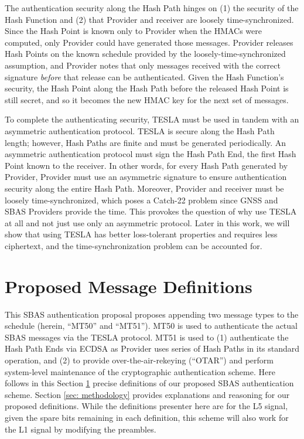 \documentclass[letterpaper,times]{IONconf/IONconf}
\begin{document}
The authentication security along the Hash Path hinges on (1) the security of the Hash Function and (2) that Provider and receiver are loosely time-synchronized.
Since the Hash Point is known only to Provider when the HMACs were computed, only Provider could have generated those messages.
Provider releases Hash Points on the known schedule provided by the loosely-time-synchronized assumption, and Provider notes that only messages received with the correct signature {\em before} that release can be authenticated.
Given the Hash Function's security, the Hash Point along the Hash Path before the released Hash Point is still secret, and so it becomes the new HMAC key for the next set of messages.

To complete the authenticating security, TESLA must be used in tandem with an asymmetric authentication protocol.
TESLA is secure along the Hash Path length; however, Hash Paths are finite and must be generated periodically.
An asymmetric authentication protocol must sign the Hash Path End, the first Hash Point known to the receiver.
In other words, for every Hash Path generated by Provider, Provider must use an asymmetric signature to ensure authentication security along the entire Hash Path.
Moreover, Provider and receiver must be loosely time-synchronized, which poses a Catch-22 problem since GNSS and SBAS Providers provide the time.
This provokes the question of why use TESLA at all and not just use only an asymmetric protocol.
Later in this work, we will show that using TESLA has better loss-tolerant properties and requires less ciphertext, and the time-synchronization problem can be accounted for.

\section{Proposed Message Definitions} \label{sec: definitions}

This SBAS authentication proposal proposes appending two message types to the schedule (herein, ``MT50'' and ``MT51'').
MT50 is used to authenticate the actual SBAS messages via the TESLA protocol.
MT51 is used to (1) authenticate the Hash Path Ends via ECDSA as Provider uses series of Hash Paths in its standard operation, and (2) to provide over-the-air-rekeying (``OTAR'') and perform system-level maintenance of the cryptographic authentication scheme.
Here follows in this Section \ref{sec: definitions} precise definitions of our proposed SBAS authentication scheme.
Section \ref{sec: methodology} provides explanations and reasoning for our proposed definitions.
While the definitions presenter here are for the L5 signal, given the spare bits remaining in each definition, this scheme will also work for the L1 signal by modifying the preambles.
\end{document}
